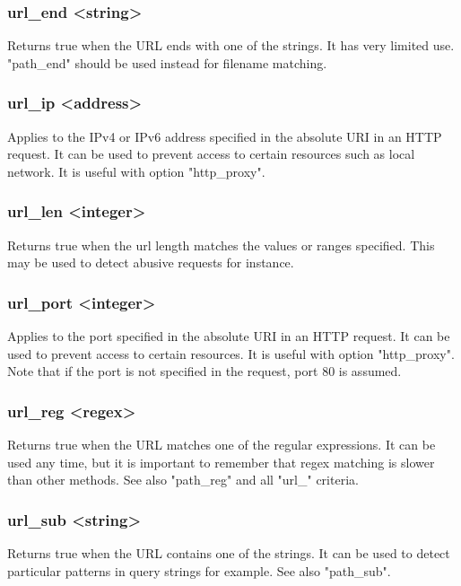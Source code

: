 \subsubsection[url\_end]{url\_end <string>}
  Returns true when the URL ends with one of the strings. It has very limited
  use. "path\_end" should be used instead for filename matching.

\subsubsection[url\_ip]{url\_ip <address>}
  Applies to the IPv4 or IPv6 address specified in the absolute URI in an HTTP
  request. It can be used to prevent access to certain resources such as local
  network. It is useful with option "http\_proxy".

\subsubsection[url\_len]{url\_len <integer>}
  Returns true when the url length matches the values or ranges specified. This
  may be used to detect abusive requests for instance.

\subsubsection[url\_port]{url\_port <integer>}
  Applies to the port specified in the absolute URI in an HTTP request. It can
  be used to prevent access to certain resources. It is useful with option
  "http\_proxy". Note that if the port is not specified in the request, port 80
  is assumed.

\subsubsection[url\_reg]{url\_reg <regex>}
  Returns true when the URL matches one of the regular expressions. It can be
  used any time, but it is important to remember that regex matching is slower
  than other methods. See also "path\_reg" and all "url\_" criteria.

\subsubsection[url\_sub]{url\_sub <string>}
  Returns true when the URL contains one of the strings. It can be used to
  detect particular patterns in query strings for example. See also "path\_sub".

